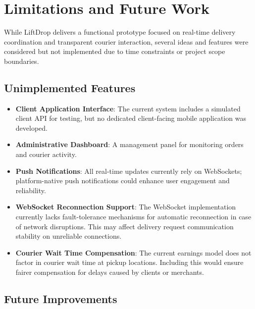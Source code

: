 \section{Limitations and Future Work}

While LiftDrop delivers a functional prototype focused on real-time delivery coordination and transparent courier interaction, several ideas and features were considered but not implemented due to time constraints or project scope boundaries.

\subsection{Unimplemented Features}

\begin{itemize}
    \item \textbf{Client Application Interface}: The current system includes a simulated client API for testing, but no dedicated client-facing mobile application was developed.
    
    \item \textbf{Administrative Dashboard}: A management panel for monitoring orders and courier activity.
    
    \item \textbf{Push Notifications}: All real-time updates currently rely on WebSockets; platform-native push notifications could enhance user engagement and reliability.

    \item \textbf{WebSocket Reconnection Support}: The WebSocket implementation currently lacks fault-tolerance mechanisms for automatic reconnection in case of network disruptions. This may affect delivery request communication stability on unreliable connections.
    
    \item \textbf{Courier Wait Time Compensation}: The current earnings model does not factor in courier wait time at pickup locations. Including this would ensure fairer compensation for delays caused by clients or merchants.
\end{itemize}

\subsection{Future Improvements}

